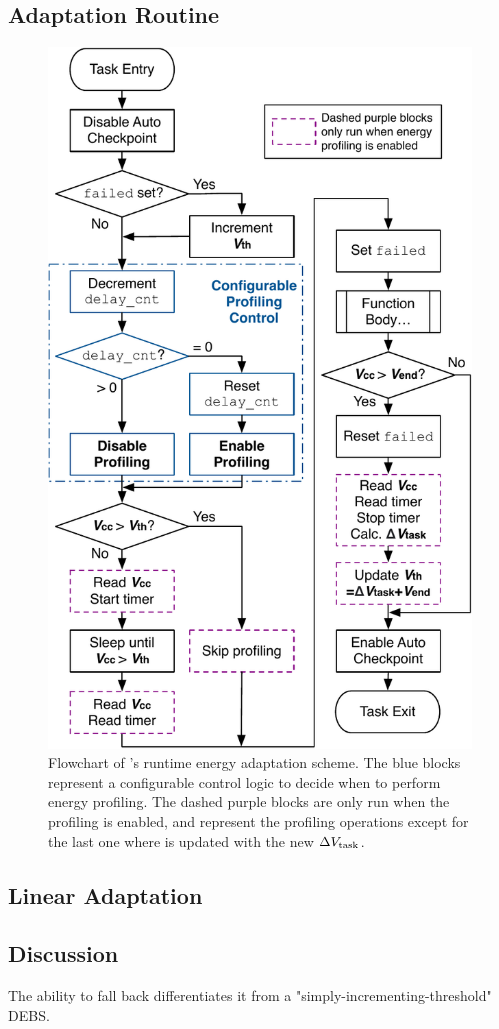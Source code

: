 \subsection{Adaptation Routine}

\begin{figure}
    \centering
    \includegraphics[width=0.8\columnwidth]{ch5_optic/figures/flowchart.pdf}
    \caption{Flowchart of \nn{}'s runtime energy adaptation scheme. The blue blocks represent a configurable control logic to decide when to perform energy profiling. The dashed purple blocks are only run when the profiling is enabled, and represent the profiling operations except for the last one where  is updated with the new $\Delta V_{\text{task}}$. }
    \label{fig:opta_flowchart}
\end{figure}


\subsection{Linear Adaptation}

\subsection{Discussion}

The ability to fall back differentiates it from a "simply-incrementing-threshold" DEBS.
